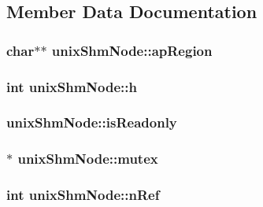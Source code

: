 \subsection{Member Data Documentation}
\hypertarget{structunix_shm_node_a8eff550f9b10a2de463e9874f84efc5e}{
\subsubsection[{ap\-Region}]{\setlength{\rightskip}{0pt plus 5cm}char$\ast$$\ast$ unix\-Shm\-Node\-::ap\-Region}}\label{structunix_shm_node_a8eff550f9b10a2de463e9874f84efc5e}
\hypertarget{structunix_shm_node_a9cd93c8052eb47f257e2d752e8f1fdba}{
\subsubsection[{h}]{\setlength{\rightskip}{0pt plus 5cm}int unix\-Shm\-Node\-::h}}\label{structunix_shm_node_a9cd93c8052eb47f257e2d752e8f1fdba}
\hypertarget{structunix_shm_node_ad241b0a85f01110310cea91aa38fccb2}{
\subsubsection[{is\-Readonly}]{ unix\-Shm\-Node\-::is\-Readonly}}\label{structunix_shm_node_ad241b0a85f01110310cea91aa38fccb2}
\hypertarget{structunix_shm_node_aa90850530f48fec6f2a872874f8ddf1f}{
\subsubsection[{mutex}]{$\ast$ unix\-Shm\-Node\-::mutex}}\label{structunix_shm_node_aa90850530f48fec6f2a872874f8ddf1f}
\hypertarget{structunix_shm_node_a6d9f0c9dec3f6710cb09c90723a8284b}{
\subsubsection[{n\-Ref}]{\setlength{\rightskip}{0pt plus 5cm}int unix\-Shm\-Node\-::n\-Ref}}\label{structunix_shm_node_a6d9f0c9dec3f6710cb09c90723a8284b}
